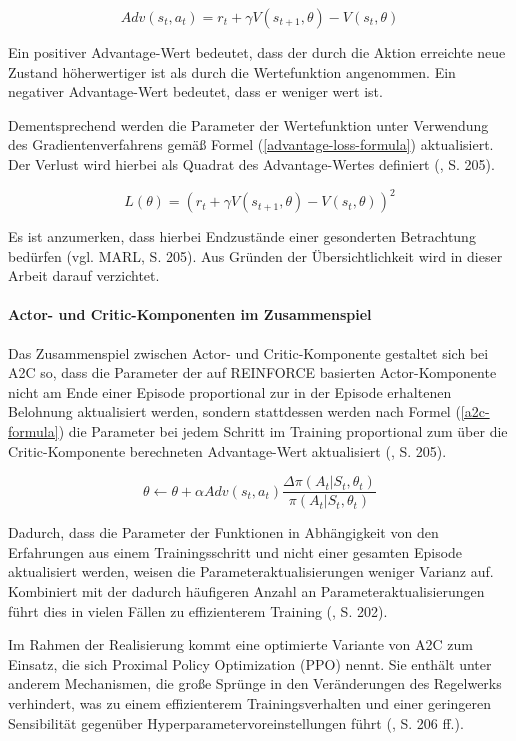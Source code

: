 \begin{equation}\label{advantage-formula}
	Adv(s_t, a_t) = r_t + \gamma V(s_{t+1}, \theta) - V(s_t, \theta)
\end{equation}

Ein positiver Advantage-Wert bedeutet, dass der durch die Aktion erreichte neue Zustand höherwertiger ist als durch die Wertefunktion angenommen. Ein negativer Advantage-Wert bedeutet, dass er weniger wert ist.

Dementsprechend werden die Parameter der Wertefunktion unter Verwendung des Gradientenverfahrens gemäß Formel (\ref{advantage-loss-formula}) aktualisiert. Der Verlust wird hierbei als Quadrat des Advantage-Wertes definiert (\cite{Albrecht.2024}, S. 205).

\begin{equation}\label{advantage-loss-formula}
	L(\theta) = (r_t + \gamma V(s_{t+1}, \theta) - V(s_t, \theta))^2
\end{equation}

Es ist anzumerken, dass hierbei Endzustände einer gesonderten Betrachtung bedürfen (vgl. MARL, S. 205). Aus Gründen der Übersichtlichkeit wird in dieser Arbeit darauf verzichtet.

\paragraph{Actor- und Critic-Komponenten im Zusammenspiel}

Das Zusammenspiel zwischen Actor- und Critic-Komponente gestaltet sich bei A2C so, dass die Parameter der auf REINFORCE basierten Actor-Komponente nicht am Ende einer Episode proportional zur in der Episode erhaltenen Belohnung aktualisiert werden, sondern stattdessen werden nach Formel (\ref{a2c-formula}) die Parameter bei jedem Schritt im Training proportional zum über die Critic-Komponente berechneten Advantage-Wert aktualisiert (\cite{Albrecht.2024}, S. 205).

\begin{equation}\label{a2c-formula}
	\theta \leftarrow \theta + \alpha Adv(s_t, a_t) \frac{\Delta \pi (A_t|S_t, \theta_t)}{\pi (A_t|S_t, \theta_t)}
\end{equation}

Dadurch, dass die Parameter der Funktionen in Abhängigkeit von den Erfahrungen aus einem Trainingsschritt und nicht einer gesamten Episode aktualisiert werden, weisen die Parameteraktualisierungen weniger Varianz auf. Kombiniert mit der dadurch häufigeren Anzahl an Parameteraktualisierungen führt dies in vielen Fällen zu effizienterem Training (\cite{Albrecht.2024}, S. 202).

Im Rahmen der Realisierung kommt eine optimierte Variante von A2C zum Einsatz, die sich Proximal Policy Optimization (PPO) nennt. Sie enthält unter anderem Mechanismen, die große Sprünge in den Veränderungen des Regelwerks verhindert, was zu einem effizienterem Trainingsverhalten und einer geringeren Sensibilität gegenüber Hyperparametervoreinstellungen führt (\cite{Albrecht.2024}, S. 206 ff.).
